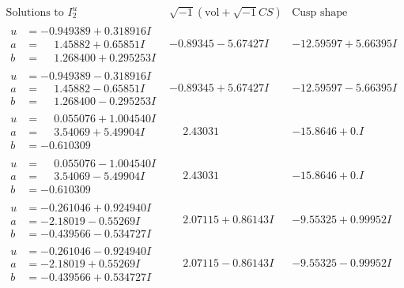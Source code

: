 \documentclass[1p]{elsarticle_modified}
\theoremstyle{definition}
\newcommand{\I}{\sqrt{-1}}
\begin{document}
$$\begin{array}{c|c|c}  
\text{Solutions to }I^u_{2}& \I (\text{vol} + \sqrt{-1}CS) & \text{Cusp shape}\\
 \hline 
\begin{aligned}
u &= -0.949389 + 0.318916 I \\
a &= \phantom{-}1.45882 + 0.65851 I \\
b &= \phantom{-}1.268400 + 0.295253 I\end{aligned}
 & -0.89345 - 5.67427 I & -12.59597 + 5.66395 I \\ \hline\begin{aligned}
u &= -0.949389 - 0.318916 I \\
a &= \phantom{-}1.45882 - 0.65851 I \\
b &= \phantom{-}1.268400 - 0.295253 I\end{aligned}
 & -0.89345 + 5.67427 I & -12.59597 - 5.66395 I \\ \hline\begin{aligned}
u &= \phantom{-}0.055076 + 1.004540 I \\
a &= \phantom{-}3.54069 + 5.49904 I \\
b &= -0.610309\phantom{ +0.000000I}\end{aligned}
 & \phantom{-}2.43031\phantom{ +0.000000I} & -15.8646 + 0. I\phantom{ +0.000000I} \\ \hline\begin{aligned}
u &= \phantom{-}0.055076 - 1.004540 I \\
a &= \phantom{-}3.54069 - 5.49904 I \\
b &= -0.610309\phantom{ +0.000000I}\end{aligned}
 & \phantom{-}2.43031\phantom{ +0.000000I} & -15.8646 + 0. I\phantom{ +0.000000I} \\ \hline\begin{aligned}
u &= -0.261046 + 0.924940 I \\
a &= -2.18019 - 0.55269 I \\
b &= -0.439566 - 0.534727 I\end{aligned}
 & \phantom{-}2.07115 + 0.86143 I & -9.55325 + 0.99952 I \\ \hline\begin{aligned}
u &= -0.261046 - 0.924940 I \\
a &= -2.18019 + 0.55269 I \\
b &= -0.439566 + 0.534727 I\end{aligned}
 & \phantom{-}2.07115 - 0.86143 I & -9.55325 - 0.99952 I \\ \hline\begin{aligned}

\end{aligned}
\end{array}$$
\end{document}
